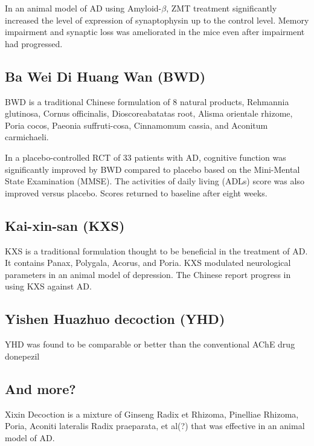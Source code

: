 \documentclass[twocolumn]{article}
\begin{document}
In an animal model of AD using Amyloid-$\beta$,
ZMT treatment significantly increased the level of expression of
synaptophysin up to the control level.
Memory impairment and synaptic loss was ameliorated in the mice
even after impairment had progressed.
\cite{tohda2003repair}



\subsection{Ba Wei Di Huang Wan (BWD)}
BWD is a traditional Chinese formulation of 8 natural products,
Rehmannia glutinosa,
Cornus officinalis,
Dioscoreabatatas root,
Alisma orientale rhizome,
Poria cocos,
Paeonia suffruti-cosa,
Cinnamomum cassia,
and Aconitum carmichaeli.

In a placebo-controlled RCT of 33 patients with AD,
cognitive function was significantly improved by BWD compared to placebo
based on the Mini-Mental State Examination (MMSE).
The activities of daily living (ADLs) score was also improved
versus placebo.
Scores returned to baseline after eight weeks.
\cite{iwasaki2004randomized}




\subsection{Kai-xin-san (KXS)}
KXS is a traditional formulation thought to be beneficial in the treatment
of AD.
It contains
Panax,
Polygala,
Acorus,
and Poria.
KXS modulated neurological parameters in an animal model of depression.
\cite{zhu2012standardized}
The Chinese report progress in using KXS against AD.
\cite{wen2013research}





\subsection{Yishen Huazhuo decoction (YHD)}
YHD was found to be comparable or better than
the conventional AChE drug donepezil

\cite{zhang2015cognitive}


\subsection{And more?}


Xixin Decoction is a mixture of
Ginseng Radix et Rhizoma,
Pinelliae Rhizoma,
Poria,
Aconiti lateralis Radix praeparata,
et al(?)
that was effective in an animal model of AD.
\cite{diwu2013effect}
\end{document}
